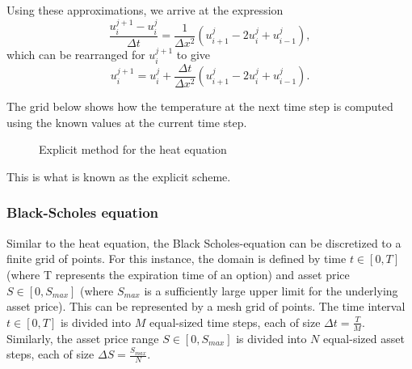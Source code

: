 Using these approximations, we arrive at the expression
\begin{equation}
    \frac{u_i^{j+1} - u_i^{j}}{\Delta t} = \frac {1}{\Delta x^2} (u_{i+1}^j - 2u_i^j + u_{i-1}^j),
\end{equation}
which can be rearranged for $u_i^{j+1}$ to give
\begin{equation}
    u_i^{j+1} = u_i^{j} + \frac {\Delta t}{\Delta x^2} (u_{i+1}^j - 2u_i^j + u_{i-1}^j).
\end{equation}

The grid below shows how the temperature at the next time step is computed using the known values at the current time step.
\begin{figure}[H]
    \centering
    \caption{Explicit method for the heat equation}
    \label{fig:heat-explicit}
\end{figure}

This is what is known as the explicit scheme.

\subsubsection{Black-Scholes equation}
Similar to the heat equation, the Black Scholes-equation can be discretized to a finite grid of points. For this instance, the domain is defined by time $t \in [0, T]$ (where T represents the expiration time of an option) and asset price $S \in [0,S_{max}]$ (where $S_{max}$ is a sufficiently large upper limit for the underlying asset price). This can be represented by a mesh grid of points.
The time interval $t \in [0, T]$ is divided into $M$ equal-sized time steps, each of size ${\Delta t} = \frac{T}{M}$. Similarly, the asset price range $S \in [0,S_{max}]$ is divided into $N$ equal-sized asset steps, each of size ${\Delta S} = \frac{S_{max}}{N}$.

